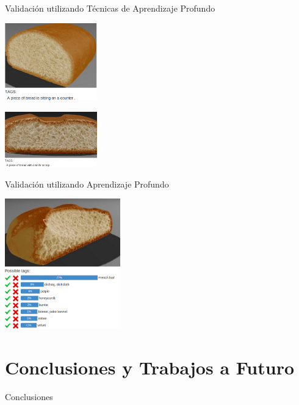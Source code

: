 \documentclass[spanish]{beamer}
\begin{document}
\begin{frame}{Validación utilizando Técnicas de Aprendizaje Profundo}

\centerline{\includegraphics[width=4cm]{../figures/deep2}}
\centerline{\includegraphics[width=4cm]{../figures/deep3}}
\end{frame}
\begin{frame}{Validación utilizando Aprendizaje Profundo}
\centerline{\includegraphics[width=5cm]{../figures/deep4}}

\end{frame}



\section[Conclusiones]{Conclusiones y Trabajos a Futuro}


\begin{frame}
\begin{block}{}
\begin{center}
\vspace{1cm}
\huge{Conclusiones}
\vspace{1cm}
\end{center}
\end{block}
\end{frame}
\end{document}
